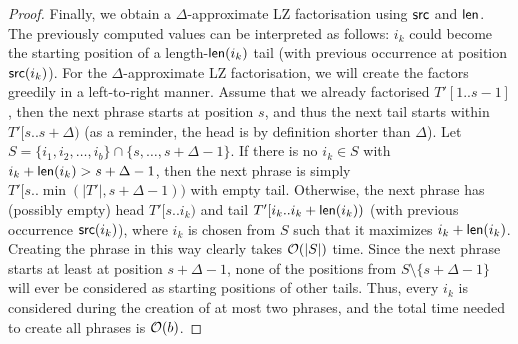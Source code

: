 \begin{proof}
Finally, we obtain a $\Delta$-approximate LZ factorisation using $\textnormal{\textsf{src}}$ and $\textnormal{\textsf{len}}$. The previously computed values can be interpreted as follows: $i_k$ could become the starting position of a length-$\textnormal{\textsf{len}}(i_k)$ tail (with previous occurrence at position $\textnormal{\textsf{src}}(i_k)$). 
For the $\Delta$-approximate LZ factorisation, we will create the factors greedily in a left-to-right manner. 
Assume that we already factorised $T'[1..s - 1]$, then the next phrase starts at position $s$, and thus the next tail starts within $T'[s..s + \Delta)$ (as a reminder, the head is by definition shorter than $\Delta$). 
Let $S = \{i_1, i_2, \dots,i_b\} \cap \{s, \dots, s + \Delta - 1\}$. 
If there is no $i_k \in S$ with $i_k + \textnormal{\textsf{len}}(i_k) > s + \Delta - 1$, then the next phrase is simply $T'[s..\min(|T'|,s + \Delta - 1))$ with empty tail. 
Otherwise, the next phrase has (possibly empty) head $T'[s..i_k)$ and tail $T'[i_k..i_k + \textnormal{\textsf{len}}(i_k))$ (with previous occurrence $\textnormal{\textsf{src}}(i_k)$), where $i_k$ is chosen from $S$ such that it maximizes $i_k + \textnormal{\textsf{len}}(i_k)$.
Creating the phrase in this way clearly takes $\mathcal{O}(\left\lvert S\right\rvert)$ time.
Since the next phrase starts at least at position $s + \Delta - 1$, none of the positions from $S \setminus \{s + \Delta - 1\}$ will ever be considered as starting positions of other tails. Thus, every $i_k$ is considered during the creation of at most two phrases, and the total time needed to create all phrases is $\mathcal{O}(b)$.

\newcommand{\iright}{i_k}
\newcommand{\ileft}{i_{k'}}


\end{proof}
